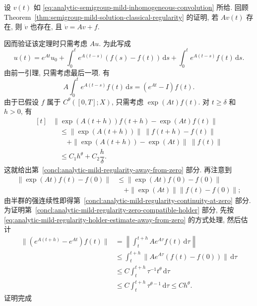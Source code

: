 \begin{Proof}
设 $v(t)$ 如 \eqref{eq:analytic-semigroup-mild-inhomogeneous-convolution} 所给. 回顾 Theorem~\ref{thm:semigroup-mild-solution-classical-regularity} 的证明, 若 $Av(t)$ 存在, 则 $\dot v$ 也存在, 且 $\dot v=Av+f$.\par 因而验证该定理时只需考虑 $Au$. 为此写成
\begin{equation}\label{eq:analytic-mild-regularity-three-part-solution-splitting}
u(t)=e^{At}u_0+\int_0^t e^{A(t-s)}(f(s)-f(t))\,\mathrm{d}s+\int_0^t e^{A(t-s)}f(t)\,\mathrm{d}s.
\end{equation}
由前一引理, 只需考虑最后一项. 有
\begin{equation}\label{eq:analytic-mild-regularity-frozen-data-generator-integral}
A\int_0^t e^{A(t-s)}f(t)\,\mathrm{d}s=(e^{At}-I)f(t).
\end{equation}
由于已假设 $f$ 属于 $C^\theta([0,T];X)$, 只需考虑 $\exp(At)f(t)$. 对 $t\geq\delta$ 和 $h>0$, 有
\begin{equation}\label{eq:analytic-mild-regularity-holder-estimate-away-from-zero}
\begin{aligned}[t]&\|\exp(A(t+h))f(t+h)-\exp(At)f(t)\|\\&\quad\leq\|\exp(A(t+h))\|\ \|f(t+h)-f(t)\|\\&\qquad+\|\exp(A(t+h))-\exp(At)\|\ \|f(t)\|\\&\quad\leq C_1h^\theta+C_2\dfrac{h}{\delta}.\end{aligned}
\end{equation}
这就给出第~\ref{concl:analytic-mild-regularity-away-from-zero} 部分. 再注意到
\begin{equation}\label{eq:analytic-mild-regularity-initial-strong-continuity-bound}
\begin{aligned}\|\exp(At)f(t)-f(0)\|&\leq\|\exp(At)f(0)-f(0)\|\\&\quad+\|\exp(At)\|\|f(t)-f(0)\|;\end{aligned}
\end{equation}
由半群的强连续性即得第~\ref{concl:analytic-mild-regularity-continuity-at-zero} 部分. 为证明第~\ref{concl:analytic-mild-regularity-zero-compatible-holder} 部分, 先按 \eqref{eq:analytic-mild-regularity-holder-estimate-away-from-zero} 的方式处理, 然后估计\[\begin{aligned}
\|(e^{A(t+h)}-e^{At})f(t)\|&=\left\|\int_t^{t+h}Ae^{A\tau}f(t)\,\mathrm{d}\tau\right\|\\
&\leq\int_t^{t+h}\|Ae^{A\tau}(f(t)-f(0))\|\,\mathrm{d}\tau\\
&\leq C\int_t^{t+h}\tau^{-1}t^\theta\,\mathrm{d}\tau\\
&\leq C\int_t^{t+h}\tau^{\theta-1}\,\mathrm{d}\tau\leq Ch^\theta.
\end{aligned}\]证明完成
\end{Proof}

